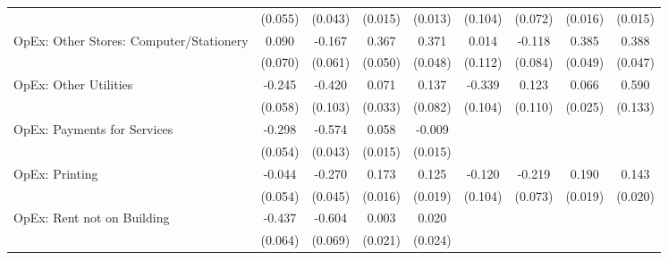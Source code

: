 {\begin{longtable}{l*{8}{c}}
                    &     (0.055)         &     (0.043)         &     (0.015)         &     (0.013)         &     (0.104)         &     (0.072)         &     (0.016)         &     (0.015)         \\
OpEx: Other Stores: Computer/Stationery&       0.090         &      -0.167\sym{**} &       0.367\sym{***}&       0.371\sym{***}&       0.014         &      -0.118         &       0.385\sym{***}&       0.388\sym{***}\\
                    &     (0.070)         &     (0.061)         &     (0.050)         &     (0.048)         &     (0.112)         &     (0.084)         &     (0.049)         &     (0.047)         \\
OpEx: Other Utilities&      -0.245\sym{***}&      -0.420\sym{***}&       0.071\sym{*}  &       0.137         &      -0.339\sym{**} &       0.123         &       0.066\sym{**} &       0.590\sym{***}\\
                    &     (0.058)         &     (0.103)         &     (0.033)         &     (0.082)         &     (0.104)         &     (0.110)         &     (0.025)         &     (0.133)         \\
OpEx: Payments for Services&      -0.298\sym{***}&      -0.574\sym{***}&       0.058\sym{***}&      -0.009         &                     &                     &                     &                     \\
                    &     (0.054)         &     (0.043)         &     (0.015)         &     (0.015)         &                     &                     &                     &                     \\
OpEx: Printing      &      -0.044         &      -0.270\sym{***}&       0.173\sym{***}&       0.125\sym{***}&      -0.120         &      -0.219\sym{**} &       0.190\sym{***}&       0.143\sym{***}\\
                    &     (0.054)         &     (0.045)         &     (0.016)         &     (0.019)         &     (0.104)         &     (0.073)         &     (0.019)         &     (0.020)         \\
OpEx: Rent not on Building&      -0.437\sym{***}&      -0.604\sym{***}&       0.003         &       0.020         &                     &                     &                     &                     \\
                    &     (0.064)         &     (0.069)         &     (0.021)         &     (0.024)         &                     &                     &                     &                     \\

\end{longtable}}
